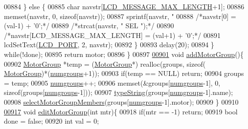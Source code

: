 \begin{DoxyCode}
{{{{{{{{{{{{{00884         \} \textcolor{keywordflow}{else} \{
00885             \textcolor{keywordtype}{char} navstr[\hyperlink{lcdmsg_8h_abe4c4b70fc6f44ae3680e5b2c68cdd00}{LCD\_MESSAGE\_MAX\_LENGTH}+1];
00886             memset(navstr, 0, \textcolor{keyword}{sizeof}(navstr));
00887             sprintf(navstr, \textcolor{stringliteral}{"%
00888             \textcolor{comment}{/*navstr[0] = (val-1) + '0';*/}
00889             \textcolor{comment}{/*strcat(navstr, "      SEL     ");*/}
00890             \textcolor{comment}{/*navstr[LCD\_MESSAGE\_MAX\_LENGTH] = (val+1) + '0';*/}
00891             lcdSetText(\hyperlink{lcdmsg_8h_abcf42bd88b3c36193f301ca25b033875}{LCD\_PORT}, 2, navstr);
00892         \}
00893         delay(20);
00894     \} \textcolor{keywordflow}{while}(!done);
00895     \textcolor{keywordflow}{return} motor;
00896 \}
00897 
\hypertarget{lcddiag_8c_source.tex_l00901}{}\hyperlink{lcddiag_8c_a9cffea5742f16bfef41b3dcf6d66cd7d}{00901} \textcolor{keywordtype}{void} \hyperlink{lcddiag_8c_a9cffea5742f16bfef41b3dcf6d66cd7d}{addMotorGroup}()\{
00902     \hyperlink{struct_motor_group}{MotorGroup} *temp = (\hyperlink{struct_motor_group}{MotorGroup}*) realloc(groups, \textcolor{keyword}{sizeof}(
      \hyperlink{struct_motor_group}{MotorGroup})*(\hyperlink{lcddiag_8c_a205f1cedec1664555276e0a71a1c87d8}{numgroups}+1));
00903     \textcolor{keywordflow}{if}(temp == NULL) \textcolor{keywordflow}{return};
00904     groups = temp;
00905     \hyperlink{lcddiag_8c_a205f1cedec1664555276e0a71a1c87d8}{numgroups}++;
00906     memset(&groups[\hyperlink{lcddiag_8c_a205f1cedec1664555276e0a71a1c87d8}{numgroups}-1], 0, \textcolor{keyword}{sizeof}(groups[\hyperlink{lcddiag_8c_a205f1cedec1664555276e0a71a1c87d8}{numgroups}-1]));
00907     \hyperlink{lcddiag_8c_a17fe3ffc769a6d02c5226b3bfb79f28f}{typeString}(groups[\hyperlink{lcddiag_8c_a205f1cedec1664555276e0a71a1c87d8}{numgroups}-1].name);
00908     \hyperlink{lcddiag_8c_a72f3f96c95c24f67103b2eb30995dccb}{selectMotorGroupMembers}(groups[\hyperlink{lcddiag_8c_a205f1cedec1664555276e0a71a1c87d8}{numgroups}-1].motor);
00909 \}
00910 
\hypertarget{lcddiag_8c_source.tex_l00917}{}\hyperlink{lcddiag_8c_a8e26ee136d643c9e069d89be0e6b019e}{00917} \textcolor{keywordtype}{void} \hyperlink{lcddiag_8c_a8e26ee136d643c9e069d89be0e6b019e}{editMotorGroup}(\textcolor{keywordtype}{int} mtr)\{
00918     \textcolor{keywordflow}{if}(mtr == -1) \textcolor{keywordflow}{return};
00919     \textcolor{keywordtype}{bool} done = \textcolor{keyword}{false};
00920     \textcolor{keywordtype}{int} val = 0;
}}}}}}}}}}}}}}
\end{DoxyCode}
